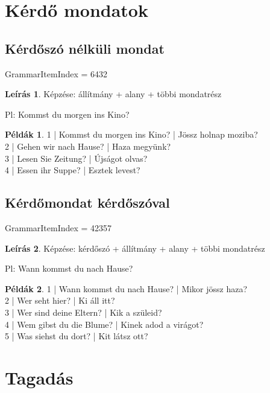 \documentclass{article}
\theoremstyle{definition}
\newtheorem*{exmp}{Példák}
\newtheorem*{desc}{Leírás}
\begin{document}
\section{Kérdő mondatok}

\subsection{Kérdőszó nélküli mondat}

GrammarItemIndex = 6432

\begin{desc}
Képzése: állítmány + alany + többi mondatrész

Pl: Kommst du morgen ins Kino?
\end{desc}

\begin{exmp}
1 | Kommst du morgen ins Kino? | Jössz holnap moziba?\\
2 | Gehen wir nach Hause? | Haza megyünk?\\
3 | Lesen Sie Zeitung? | Újságot olvas?\\
4 | Essen ihr Suppe? | Esztek levest?\\
\end{exmp}

\subsection{Kérdőmondat kérdőszóval}

GrammarItemIndex = 42357

\begin{desc}
Képzése: kérdőszó + állítmány + alany + többi mondatrész

Pl: Wann kommst du nach Hause?
\end{desc}

\begin{exmp}
1 | Wann kommst du nach Hause? | Mikor jössz haza?\\
2 | Wer seht hier? | Ki áll itt?\\
3 | Wer sind deine Eltern? | Kik a szüleid?\\
4 | Wem gibst du die Blume? | Kinek adod a virágot?\\
5 | Was siehst du dort? | Kit látsz ott?\\
\end{exmp}

\section{Tagadás}
\end{document}
